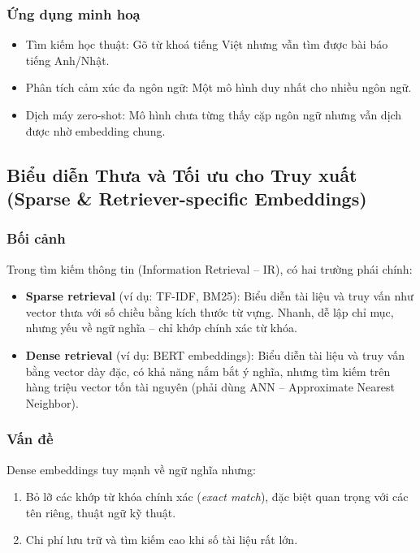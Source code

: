 \subsubsection*{Ứng dụng minh hoạ}
\begin{itemize}
    \item Tìm kiếm học thuật: Gõ từ khoá tiếng Việt nhưng vẫn tìm được bài báo tiếng Anh/Nhật.
    \item Phân tích cảm xúc đa ngôn ngữ: Một mô hình duy nhất cho nhiều ngôn ngữ.
    \item Dịch máy zero-shot: Mô hình chưa từng thấy cặp ngôn ngữ nhưng vẫn dịch được nhờ embedding chung.
\end{itemize}


\subsection{Biểu diễn Thưa và Tối ưu cho Truy xuất (Sparse \& Retriever-specific Embeddings)}
\label{ssec:sparse_retriever_embeddings}

\subsubsection*{Bối cảnh}
Trong tìm kiếm thông tin (Information Retrieval – IR), có hai trường phái chính:
\begin{itemize}
    \item \textbf{Sparse retrieval} (ví dụ: TF-IDF, BM25): Biểu diễn tài liệu và truy vấn như vector thưa với số chiều bằng kích thước từ vựng. Nhanh, dễ lập chỉ mục, nhưng yếu về ngữ nghĩa – chỉ khớp chính xác từ khóa.
    \item \textbf{Dense retrieval} (ví dụ: BERT embeddings): Biểu diễn tài liệu và truy vấn bằng vector dày đặc, có khả năng nắm bắt ý nghĩa, nhưng tìm kiếm trên hàng triệu vector tốn tài nguyên (phải dùng ANN – Approximate Nearest Neighbor).
\end{itemize}

\subsubsection*{Vấn đề}
Dense embeddings tuy mạnh về ngữ nghĩa nhưng:
\begin{enumerate}
    \item Bỏ lỡ các khớp từ khóa chính xác (\textit{exact match}), đặc biệt quan trọng với các tên riêng, thuật ngữ kỹ thuật.
    \item Chi phí lưu trữ và tìm kiếm cao khi số tài liệu rất lớn.
\end{enumerate}

